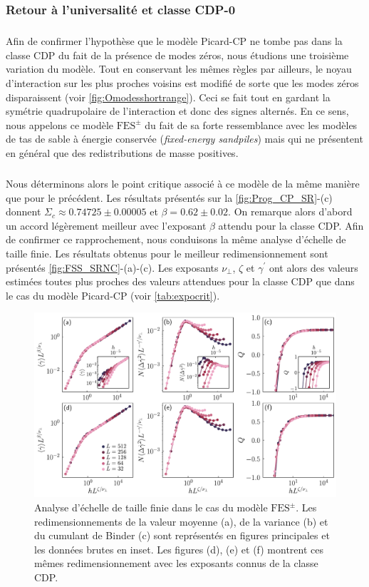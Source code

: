 \subsubsection{Retour à l'universalité et classe CDP-0}

\label{sec:continuCDP0}

\subparagraph{}Afin de confirmer l'hypothèse que le modèle Picard-CP ne tombe pas dans la classe CDP du fait de la présence de modes zéros, nous étudions une troisième variation du modèle. Tout en conservant les mêmes règles par ailleurs, le noyau d'interaction sur les plus proches voisins est modifié de sorte que les modes zéros disparaissent (voir \autoref{fig:Omodesshortrange}). Ceci se fait tout en gardant la symétrie quadrupolaire de l'interaction et donc des signes alternés. En ce sens, nous appelons ce modèle $\text{FES}^\pm$ du fait de sa forte ressemblance avec les modèles de tas de sable à énergie conservée (\textit{fixed-energy sandpiles}) mais qui ne présentent en général que des redistributions de masse positives.

\subparagraph{}Nous déterminons alors le point critique associé à ce modèle de la même manière que pour le précédent. Les résultats présentés sur la \autoref{fig:Prog_CP_SR}-(c) donnent $\Sigma_c \approx 0.74725 \pm 0.00005$ et $\beta = 0.62 \pm 0.02$. On remarque alors d'abord un accord légèrement meilleur avec l'exposant $\beta$ attendu pour la classe CDP. Afin de confirmer ce rapprochement, nous conduisons la même analyse d'échelle de taille finie. Les résultats obtenus pour le meilleur redimensionnement sont présentés \autoref{fig:FSS_SRNC}-(a)-(c). Les exposants $\nu_\perp$, $\zeta$ et $\gamma^\prime$ ont alors des valeurs estimées toutes plus proches des valeurs attendues pour la classe CDP que dans le cas du modèle Picard-CP (voir \autoref{tab:expocrit}). 

\begin{figure}[h]
	\centering
	\includegraphics[width=\textwidth]{Chapitre4/Figures/CourtePortee/FSS_SRNC_edited.pdf}
	\caption{Analyse d'échelle de taille finie dans le cas du modèle $\text{FES}^\pm$. Les redimensionnements de la valeur moyenne (a), de la variance (b) et du cumulant de Binder (c) sont représentés en figures principales et les données brutes en inset. Les figures (d), (e) et (f) montrent ces mêmes redimensionnement avec les exposants connus de la classe CDP.}
	\label{fig:FSS_SRNC}
\end{figure}

